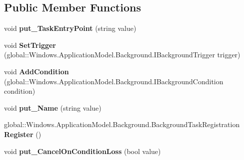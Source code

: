 \subsection*{Public Member Functions}
\begin{DoxyCompactItemize}
\item 
\mbox{\label{class_windows_1_1_application_model_1_1_background_1_1_background_task_builder_a35a57878e11b366a14d19cfe9b9168c9}} 
void {\bfseries put\+\_\+\+Task\+Entry\+Point} (string value)
\item 
\mbox{\label{class_windows_1_1_application_model_1_1_background_1_1_background_task_builder_ad3977b98abc7d118a48c9e6d131bc233}} 
void {\bfseries Set\+Trigger} (global\+::\+Windows.\+Application\+Model.\+Background.\+I\+Background\+Trigger trigger)
\item 
\mbox{\label{class_windows_1_1_application_model_1_1_background_1_1_background_task_builder_a9012601dbb13cc38b6863575770044f0}} 
void {\bfseries Add\+Condition} (global\+::\+Windows.\+Application\+Model.\+Background.\+I\+Background\+Condition condition)
\item 
\mbox{\label{class_windows_1_1_application_model_1_1_background_1_1_background_task_builder_a4250f9dec67adfee854b2884069c027b}} 
void {\bfseries put\+\_\+\+Name} (string value)
\item 
\mbox{\label{class_windows_1_1_application_model_1_1_background_1_1_background_task_builder_a97adeab2432933ca3bc4ee6e4852e5a0}} 
global\+::\+Windows.\+Application\+Model.\+Background.\+Background\+Task\+Registration {\bfseries Register} ()
\item 
\mbox{\label{class_windows_1_1_application_model_1_1_background_1_1_background_task_builder_a0739c66afd9bb62e0746d82fc02b1ca0}} 
void {\bfseries put\+\_\+\+Cancel\+On\+Condition\+Loss} (bool value)

\end{DoxyCompactItemize}
